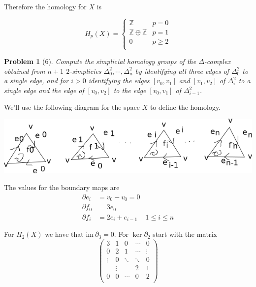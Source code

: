 \documentclass[10pt]{article}
\newcommand{\sk}{\vskip 10mm}
\newcommand{\bb}[1]{\mathbb{#1}}
\newcommand{\ima}{\mathrm{im}\ }
\theoremstyle{plain}
\newtheorem{problem}{Problem}
\theoremstyle{remark}
\begin{document}
Therefore the homology for $X$ is

\[
  H_p(X)=
  \left\{
    \begin{array}{ll}
      \bb{Z} & p=0\\
      \bb{Z}\oplus\bb{Z} & p=1\\
      0 & p\geq 2\\
    \end{array}
  \right.
\]

\sk

\begin{problem}[6]
  Compute the simplicial homology groups of the $\Delta$-complex obtained
  from $n+1$ $2$-simplicies $\Delta^2_0, \cdots, \Delta^2_n$ by identifying
  all three edges of $\Delta^2_0$ to a single edge, and for $i>0$ identifying
  the edges $[v_0,v_1]$ and $[v_1,v_2]$ of $\Delta^2_i$ to a single edge and
  the edge of $[v_0,v_2]$ to the edge $[v_0,v_1]$ of $\Delta^2_{i-1}$.
\end{problem}

We'll use the following diagram for the space $X$ to define the homology.

\begin{center}
  \includegraphics[scale=.7]{other}  
\end{center}

The values for the boundary maps are
\begin{align*}
  \partial e_i &= v_0-v_0=0\\
  \partial f_0 &= 3e_0\\
  \partial f_i &= 2e_i+e_{i-1} & 1\leq i\leq n
\end{align*}

For $H_2(X)$ we have that $\ima \partial_3=0$. For $\ker \partial_2$ start with the matrix
\[
  \left(
    \begin{array}{ccccc}
      3&1&0&\cdots&0\\
      0&2&1&\cdots&\vdots\\
      \vdots&0&\ddots&\ddots&0\\
       &\vdots&&2&1\\
      0&0&\cdots&0&2\\
    \end{array}
  \right)
\]
\end{document}
